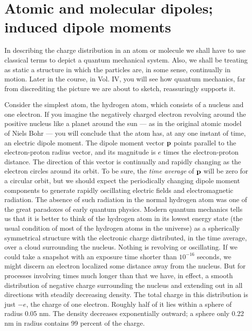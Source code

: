 
\section{Atomic and molecular dipoles; induced dipole moments}

In describing the charge distribution in an atom or molecule we
shall have to use classical terms to depict a quantum mechanical
system. Also, we shall be treating as static a structure in which the
particles are, in some sense, continually in motion. Later in the
course, in Vol. IV, you will see how quantum mechanics, far from discrediting
the picture we are about to sketch, reassuringly supports it.

Consider the simplest atom, the hydrogen atom, which consists of
a nucleus and one electron. If you imagine the negatively charged
electron revolving around the positive nucleus like a planet around
the sun --- as in the original atomic model of Niels Bohr --- you will
conclude that the atom has, at any one instant of time, an electric
dipole moment. The dipole moment vector $\mathbf{p}$ points parallel to the
electron-proton radius vector, and its magnitude is $e$ times the
electron-proton distance. The direction of this vector is continually
and rapidly changing as the electron circles around its orbit. To be
sure, the \emph{time average} of $\mathbf{p}$ will be zero for a circular orbit, but we
should expect the periodically changing dipole moment components
to generate rapidly oscillating electric fields and electromagnetic
radiation. The absence of such radiation in the normal hydrogen
atom was one of the great paradoxes of early quantum physics.
Modern quantum mechanics tells us that it is better to think of the
hydrogen atom in its lowest energy state (the usual condition of most
of the hydrogen atoms in the universe) as a spherically symmetrical
structure with the electronic charge distributed, in the time average,
over a cloud surrounding the nucleus. Nothing is revolving or
oscillating. If we could take a snapshot with an exposure time
shorter than $10^{-16}$ seconds, we might discern an electron localized
some distance away from the nucleus. But for processes involving
times much longer than that we have, in effect, a smooth distribution
of negative charge surrounding the nucleus and extending out in all
directions with steadily decreasing density. The total charge in this
distribution is just  $-e$, the charge of one electron. Roughly half of
it lies within a sphere of radius 0.05 nm. The
density decreases exponentially outward; a sphere only 0.22 nm
in radius contains 99 percent of the charge.

